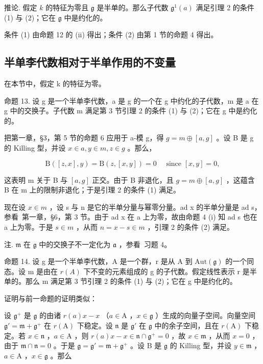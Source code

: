 推论. 假定 \(k\) 的特征为零且 \(\mathfrak{g}\) 是半单的。那么子代数 \(\mathfrak{g}^1(a)\) 满足引理 2 的条件 (1) 与 (2)；它在 \(\mathfrak{g}\) 中是约化的。

条件 (1) 由命题 12 的 (ii) 得出；条件 (2) 由第 1 节的命题 4 得出。

\subsection{半单李代数相对于半单作用的不变量}

在本节中，假定 k 的特征为零。

命题 13. 设 g 是一个半单李代数，a 是 g 的一个在 g 中约化的子代数，m 是 a 在 g 中的交换子。子代数 m 满足第 3 节引理 2 的条件 (1) 与 (2)；它在 g 中是约化的。

把第一章，§3，第 5 节的命题 6 应用于 a-模 g，得 \(g = m \oplus [a, g]\) 。设 B 是 g 的 Killing 型，并设 \(x \in a, y \in m, z \in g\) 。那么，

\[
\mathrm{B} ([ z, x ], y) = \mathrm{B} (z, [ x, y ]) = 0 \quad \text { since } [ x, y ] = 0,
\]

这表明 m 关于 B 与 \([a,g]\) 正交。由于 B 非退化，且 \(g = m \oplus [a,g]\) ，这蕴含 B 在 m 上的限制非退化；于是引理 2 的条件 (1) 满足。

现在设 \(x \in m\) ，设 s 与 n 是它的半单分量与幂零分量。ad x 的半单分量是 ad s，参看~第一章，§6，第 3 节。由于 ad x 在 a 上为零，故由命题 4 (i) 知 ad s 也在 a 上为零。于是 \(s \in m\) ，从而 \(n = x - s \in m\) ，引理 2 的条件 (2) 满足。

注. \(\mathfrak{m}\) 在 \(\mathfrak{g}\) 中的交换子不一定化为 \(\mathfrak{a}\) ，参看~习题 4。

命题 14. 设 g 是一个半单李代数，A 是一个群，r 是从 A 到 \(\text{Aut}(\mathfrak{g})\) 的一个同态。设 m 是由在 \(r(A)\) 下不变的元素组成的 g 的子代数。假定线性表示 r 是半单的。那么 m 满足第 3 节引理 2 的条件 (1) 与 (2)；它在 g 中是约化的。

证明与前一命题的证明类似：

设 \(\mathfrak{g}^{+}\) 是 \(\mathfrak{g}\) 的由诸 \(r(a)x - x\) （\(a \in \mathrm{A}\) ，\(x \in \mathfrak{g}\) ）生成的向量子空间。向量空间 \(\mathfrak{g}' = \mathfrak{m} + \mathfrak{g}^{+}\) 在 \(r(\mathrm{A})\) 下稳定。设 \(\mathfrak{n}\) 是 \(\mathfrak{g}'\) 在 \(\mathfrak{g}\) 中的余子空间，且在 \(r(\mathrm{A})\) 下稳定。若 \(x \in \mathfrak{n}\) ，\(a \in \mathrm{A}\) ，则 \(r(a)x - x \in \mathfrak{n} \cap \mathfrak{g}^{+} = 0\) ，故 \(x \in \mathfrak{m}\) ，从而 \(x = 0\) ，由于 \(\mathfrak{m} \cap \mathfrak{n} = 0\) 。于是 \(\mathfrak{g} = \mathfrak{g}' = \mathfrak{m} + \mathfrak{g}^{+}\) 。设 B 是 \(\mathfrak{g}\) 的 Killing 型，并设 \(y \in \mathfrak{m}\) ，\(a \in \mathrm{A}\) ，\(x \in \mathfrak{g}\) 。那么

